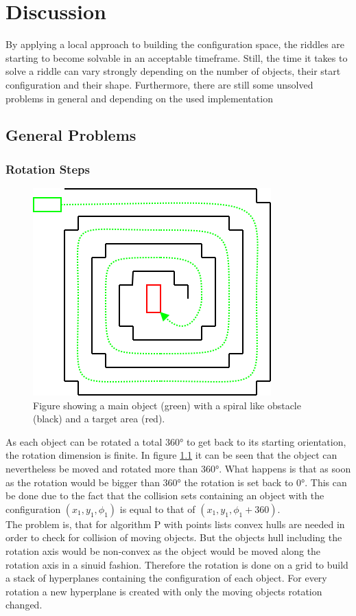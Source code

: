 \chapter{Discussion}
By applying a local approach to building the configuration space, the riddles are starting to become solvable in an acceptable timeframe.
Still, the time it takes to solve a riddle can vary strongly depending on the number of objects, their start configuration and their shape. Furthermore, there are still some unsolved problems in general and depending on the used implementation

\section{General Problems}
\subsection{Rotation Steps}
\begin{figure}[H]
\centering
\includegraphics[scale=0.5]{endlessRot}
\caption{Figure showing a main object (green) with a spiral like obstacle (black) and a target area (red).}
\label{rotFigure}
\end{figure}
As each object can be rotated a total 360° to get back to its starting orientation, the rotation dimension is finite. In figure \ref{rotFigure} it can be seen that the object can nevertheless be moved and rotated more than 360°. What happens is that as soon as the rotation would be bigger than 360° the rotation is set back to 0°. This can be done due to the fact that the collision sets containing an object with the configuration $(x_1 , y_1, \phi_1)$ is equal to that of $(x_1, y_1, \phi_1 + 360)$.\\
The problem is, that for algorithm P with points lists convex hulls are needed in order to check for collision of moving objects. But the objects hull including the rotation axis would be non-convex as the object would be moved along the rotation axis in a sinuid fashion. Therefore the rotation is done on a grid to build a stack of hyperplanes containing the configuration of each object. For every rotation a new hyperplane is created with only the moving objects rotation changed.\\
